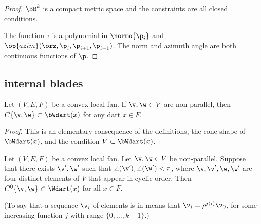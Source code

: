 \begin{proof} $\BB^k$ is a compact metric space and the constraints
are all closed conditions.

The function $\tau$ is a polynomial in $\normo{\p_i}$ and
$\op{azim}(\orz,\p_i,\p_{i+1},\p_{i-1})$.  The norm and azimuth
angle are both continuous functions of $\p$.
\end{proof}




\subsection{internal blades}


\begin{lemma}[] Let $(V,E,F)$ be a convex local fan.
If $\v,\w\in V$ are non-parallel, then $C\{\v,\w\} \subset
\bWdart(x)$ for any dart $x\in F$.
\end{lemma}
%

\begin{proof} This is an elementary consequence of the definitions,
the cone shape of $\bWdart(x)$, and the condition $V\subset
\bWdart(x)$.
\end{proof}


\begin{lemma} \label{lemma:internal}
Let $(V,E,F)$ be a convex local fan.  Let $\v,\w\in V$ be non-parallel.
Suppose that there exists $\v',\w'$ such that
$\angle(\v'),\angle(\w')<\pi$, where $\v,\v',\w,\w'$ are four
distinct elements of $V$ that appear in cyclic order.  Then
$C^0\{\v,\w\}\subset \Wdart(x)$ for all $x\in F$.
\end{lemma}
%
%
%

(To say that a sequence $\v_i$ of elements is in  means that $\v_i = \rho^{j (i)}\v_0$, for some increasing
function $j$ with range $\{0,\ldots,k-1\}$.)

